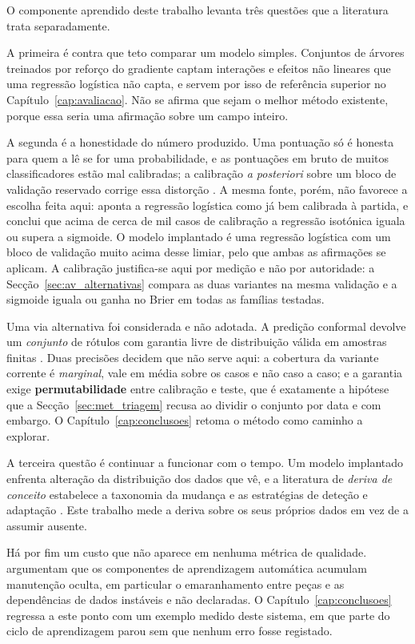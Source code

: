 O componente aprendido deste trabalho levanta três questões que a literatura trata separadamente.

A primeira é contra que teto comparar um modelo simples. Conjuntos de árvores treinados por reforço
do gradiente \autocite{friedman2001gbm} captam interações e efeitos não lineares que uma regressão
logística não capta, e servem por isso de referência superior no Capítulo~\ref{cap:avaliacao}. Não
se afirma que sejam o melhor método existente, porque essa seria uma afirmação sobre um campo
inteiro.

A segunda é a honestidade do número produzido. Uma pontuação só é honesta para quem a lê se for uma
probabilidade, e as pontuações em bruto de muitos classificadores estão mal calibradas; a
calibração \emph{a posteriori} sobre um bloco de validação reservado corrige essa distorção
\autocite{niculescu2005calibration}. A mesma fonte, porém, não favorece a escolha feita aqui:
aponta a regressão logística como já bem calibrada à partida, e conclui que acima de cerca de mil
casos de calibração a regressão isotónica iguala ou supera a sigmoide. O modelo implantado é uma
regressão logística com um bloco de validação muito acima desse limiar, pelo que ambas as
afirmações se aplicam. A calibração justifica-se aqui por medição e não por autoridade: a
Secção~\ref{sec:av_alternativas} compara as duas variantes na mesma validação e a sigmoide iguala
ou ganha no Brier em todas as famílias testadas.

Uma via alternativa foi considerada e não adotada. A predição conformal devolve um \emph{conjunto}
de rótulos com garantia livre de distribuição válida em amostras finitas
\autocite{vovk2005algorithmic, angelopoulos2023conformal}. Duas precisões decidem que não serve
aqui: a cobertura da variante corrente é \emph{marginal}, vale em média sobre os casos e não caso a
caso; e a garantia exige \textbf{permutabilidade} entre calibração e teste, que é exatamente a
hipótese que a Secção~\ref{sec:met_triagem} recusa ao dividir o conjunto por data e com embargo. O
Capítulo~\ref{cap:conclusoes} retoma o método como caminho a explorar.

A terceira questão é continuar a funcionar com o tempo. Um modelo implantado enfrenta alteração da
distribuição dos dados que vê, e a literatura de \emph{deriva de conceito} estabelece a taxonomia
da mudança e as estratégias de deteção e adaptação \autocite{gama2014survey}. Este trabalho mede a
deriva sobre os seus próprios dados em vez de a assumir ausente.

Há por fim um custo que não aparece em nenhuma métrica de qualidade. \textcite{sculley2015debt}
argumentam que os componentes de aprendizagem automática acumulam manutenção oculta, em particular
o emaranhamento entre peças e as dependências de dados instáveis e não declaradas. O
Capítulo~\ref{cap:conclusoes} regressa a este ponto com um exemplo medido deste sistema, em que
parte do ciclo de aprendizagem parou sem que nenhum erro fosse registado.


